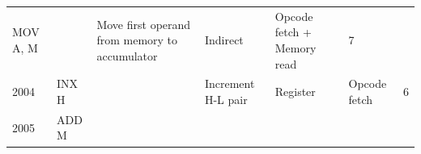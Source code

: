 \documentclass[11pt,twocolumn]{article}
\begin{document}
\begin{longtable}[]{@{}lllllll@{}}
\begin{minipage}[t]{0.05\columnwidth}
MOV A, M\strut
\end{minipage} & \begin{minipage}[t]{0.05\columnwidth}\raggedright
\strut
\end{minipage} & \begin{minipage}[t]{0.37\columnwidth}\raggedright
Move first operand from memory to accumulator\strut
\end{minipage} & \begin{minipage}[t]{0.09\columnwidth}\raggedright
Indirect\strut
\end{minipage} & \begin{minipage}[t]{0.17\columnwidth}\raggedright
Opcode fetch + Memory read\strut
\end{minipage} & \begin{minipage}[t]{0.05\columnwidth}\raggedright
7\strut
\end{minipage}\tabularnewline
\begin{minipage}[t]{0.04\columnwidth}\raggedright
2004\strut
\end{minipage} & \begin{minipage}[t]{0.05\columnwidth}\raggedright
INX H\strut
\end{minipage} & \begin{minipage}[t]{0.05\columnwidth}\raggedright
\strut
\end{minipage} & \begin{minipage}[t]{0.37\columnwidth}\raggedright
Increment H-L pair\strut
\end{minipage} & \begin{minipage}[t]{0.09\columnwidth}\raggedright
Register\strut
\end{minipage} & \begin{minipage}[t]{0.17\columnwidth}\raggedright
Opcode fetch\strut
\end{minipage} & \begin{minipage}[t]{0.05\columnwidth}\raggedright
6\strut
\end{minipage}\tabularnewline
\begin{minipage}[t]{0.04\columnwidth}\raggedright
2005\strut
\end{minipage} & \begin{minipage}[t]{0.05\columnwidth}\raggedright
ADD M\strut
\end{minipage} & \begin{minipage}[t]{0.05\columnwidth}\raggedright
\strut
\end{minipage} & \begin{minipage}[t]{0.37\columnwidth}\raggedright

\end{minipage}
\end{longtable}
\end{document}
